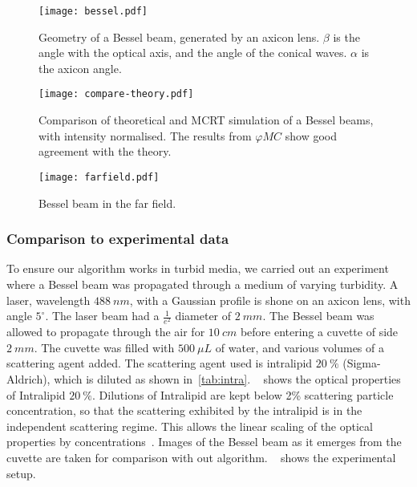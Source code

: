 \begin{figure}[!ht]
    \centering
    \texttt{[image: bessel.pdf]}
    \caption{Geometry of a Bessel beam, generated by an axicon lens. $\beta$ is the angle with the optical axis, and the angle of the conical waves. $\alpha$ is the axicon angle.}
    \label{fig:besselgeo}
\end{figure}




\begin{figure}[!ht]
    \centering
    \texttt{[image: compare-theory.pdf]}
    \caption{Comparison of theoretical and MCRT simulation of a Bessel beams, with intensity normalised. The results from $\varphi MC$ show good agreement with the theory.}
    \label{fig:besselCompare}
\end{figure}

\begin{figure}
\centering
\texttt{[image: farfield.pdf]}
\caption{Bessel beam in the far field.}
\label{fig:farfield}
\end{figure}

\FloatBarrier

\subsubsection*{Comparison to experimental data}

To ensure our algorithm works in turbid media, we carried out an experiment where a Bessel beam was propagated through a medium of varying turbidity.
A laser, wavelength $488~nm$, with a Gaussian profile is shone on an axicon lens, with angle $5^{\circ}$.
The laser beam had a $\tfrac{1}{e^2}$ diameter of $2~mm$. 
The Bessel beam was allowed to propagate through the air for $10~cm$ before entering a cuvette of side $2~mm$.
The cuvette was filled with $500~\mu L$ of water, and various volumes of a scattering agent added.
The scattering agent used is intralipid $20~\%$ (Sigma-Aldrich), which is diluted as shown in~\cref{tab:intra}.
~ shows the optical properties of Intralipid $20~\%$.
Dilutions of Intralipid are kept below 2\% scattering particle concentration, so that the scattering exhibited by the intralipid is in the independent scattering regime.
This allows the linear scaling of the optical properties by concentrations~\cite{aernouts2013supercontinuum,vardaki2015studying,di2011effect}.
Images of the Bessel beam as it emerges from the cuvette are taken for comparison with out algorithm.
~ shows the experimental setup.

